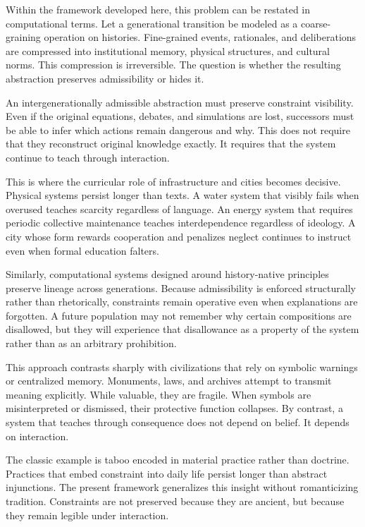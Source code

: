 \documentclass[12pt,oneside]{book}
\begin{document}
Within the framework developed here, this problem can be restated in computational terms. Let a generational transition be modeled as a coarse-graining operation on histories. Fine-grained events, rationales, and deliberations are compressed into institutional memory, physical structures, and cultural norms. This compression is irreversible. The question is whether the resulting abstraction preserves admissibility or hides it.

An intergenerationally admissible abstraction must preserve constraint visibility. Even if the original equations, debates, and simulations are lost, successors must be able to infer which actions remain dangerous and why. This does not require that they reconstruct original knowledge exactly. It requires that the system continue to teach through interaction.

This is where the curricular role of infrastructure and cities becomes decisive. Physical systems persist longer than texts. A water system that visibly fails when overused teaches scarcity regardless of language. An energy system that requires periodic collective maintenance teaches interdependence regardless of ideology. A city whose form rewards cooperation and penalizes neglect continues to instruct even when formal education falters.

Similarly, computational systems designed around history-native principles preserve lineage across generations. Because admissibility is enforced structurally rather than rhetorically, constraints remain operative even when explanations are forgotten. A future population may not remember why certain compositions are disallowed, but they will experience that disallowance as a property of the system rather than as an arbitrary prohibition.

This approach contrasts sharply with civilizations that rely on symbolic warnings or centralized memory. Monuments, laws, and archives attempt to transmit meaning explicitly. While valuable, they are fragile. When symbols are misinterpreted or dismissed, their protective function collapses. By contrast, a system that teaches through consequence does not depend on belief. It depends on interaction.

The classic example is taboo encoded in material practice rather than doctrine. Practices that embed constraint into daily life persist longer than abstract injunctions. The present framework generalizes this insight without romanticizing tradition. Constraints are not preserved because they are ancient, but because they remain legible under interaction.
\end{document}
